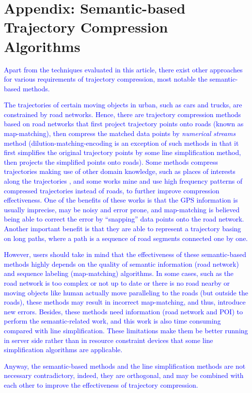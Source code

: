 \section*{{Appendix: Semantic-based Trajectory Compression Algorithms}}
\textcolor{blue}{Apart from the techniques evaluated in this article, there exist other approaches for various requirements of trajectory compression, most notable the semantic-based methods.}

\textcolor{blue}{The trajectories of certain moving objects in urban, such as cars and trucks, are constrained by road networks. Hence, there are trajectory compression methods based on road networks \cite{Chen:Trajectory, Popa:Spatio,Civilis:Techniques,Hung:Clustering, Kellaris:Map, Song:PRESS, Han:Compress, Cao:Road} that first project trajectory points onto roads (known as map-matching), then compress the matched data points by \emph{numerical streams} method \cite{Elmeleegy:Stream} (dilution-matching-encoding \cite{Gotsman:Compaction} is an exception of such methods in that it first simplifies the original trajectory points by some line simplification method, then projects the simplified points onto roads).}
%
\textcolor{blue}{Some methods \cite{Schmid:Semantic, Richter:Semantic} compress trajectories making use of other domain knowledge, such as places of interests along the trajectories \cite{Richter:Semantic}, and some works \cite{Gotsman:Compaction, Song:PRESS, Han:Compress,Koide:CiNCT} mine and use high frequency patterns of compressed trajectories instead of roads, to further improve compression effectiveness.}
%
\textcolor{blue}{One of the benefits of these works is that the GPS information is usually imprecise, may be noisy and error prone\cite{Cao:Road}, and map-matching is believed being able to correct the error by “snapping” data points onto the road network.
Another important benefit is that they are able to represent a trajectory basing on long paths, where a path is a sequence of road segments connected one by one.}

\textcolor{blue}{However, users should take in mind that the effectiveness of these semantic-based methods highly depends on the quality of semantic information (\eg road network) and sequence labeling (\eg map-matching) algorithms. In some cases, such as the road network is too complex or not up to date or there is no road nearby or moving objects like human actually move paralleling to the roads (but outside the roads), these methods may result in incorrect map-matching, and thus, introduce new errors.}
\textcolor{blue}{Besides, these methods need information (\eg road network and POI) to perform the semantic-related work, and this work is also time consuming compared with line simplification. These limitations make them be better running in server side rather than in resource constraint devices that some line simplification algorithms are applicable.}

\textcolor{blue}{Anyway, the semantic-based methods and the line simplification methods are not necessary contradictory, indeed, they are orthogonal, and may be combined with each other to improve the effectiveness of trajectory compression.}



